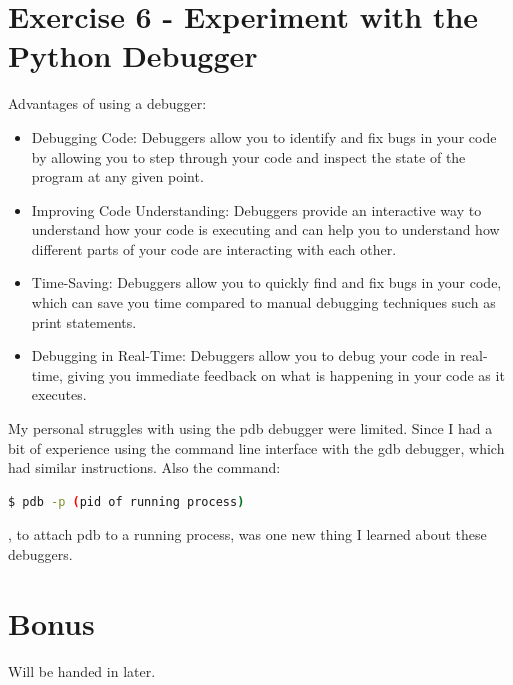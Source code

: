 \documentclass{article}
\begin{document}
\section{Exercise 6 - Experiment with the Python Debugger}

Advantages of using a debugger:
\begin{itemize}
    \item Debugging Code: Debuggers allow you to identify and fix bugs in your code by allowing you to step through your code and inspect the state of the program at any given point.
    \item Improving Code Understanding: Debuggers provide an interactive way to understand how your code is executing and can help you to understand how different parts of your code are interacting with each other.
    \item Time-Saving: Debuggers allow you to quickly find and fix bugs in your code, which can save you time compared to manual debugging techniques such as print statements.
    \item Debugging in Real-Time: Debuggers allow you to debug your code in real-time, giving you immediate feedback on what is happening in your code as it executes.
\end{itemize}

My personal struggles with using the pdb debugger were limited. 
Since I had a bit of experience using the command line interface with the gdb debugger, which had similar instructions.
Also the command:
\begin{lstlisting}[language=bash]
  $ pdb -p (pid of running process)
\end{lstlisting}
, to attach pdb to a running process, was one new thing I learned about these debuggers.



\section{Bonus}

Will be handed in later.
\end{document}

